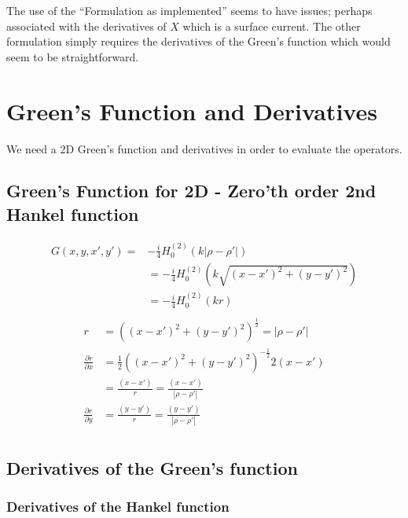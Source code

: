 \documentclass{article}
\newcommand{\0}{\varnothing}
\begin{document}
The use of the ``Formulation as implemented'' seems to have issues; perhaps associated with the derivatives of $X$ which is a surface current. The other formulation simply requires the derivatives of the Green's function which would seem to be straightforward.

\newpage
\section{Green's Function and Derivatives}

We need a 2D Green's function and derivatives in order to evaluate the operators.

\subsection{Green's Function for 2D - Zero'th order 2nd Hankel function}
\begin{align*}
    G(x, y, x', y') = &-\frac{i}{4}H_0^{(2)}(k|\rho-\rho'|)\\
     &= -\frac{i}{4}H_0^{(2)}(k\sqrt{(x-x')^2+(y-y')^2})\\
     &= -\frac{i}{4}H_0^{(2)}(k r)\\
\end{align*}
\begin{align*}
     r &= ((x-x')^2+(y-y')^2)^{\frac{1}{2}} = |\rho-\rho'|\\
     \frac{\partial r}{\partial x} &= \frac{1}{2} ((x-x')^2+(y-y')^2)^{-\frac{1}{2}} 2 (x-x')\\ 
     & = \frac{(x-x')}{r} = \frac{(x-x')}{|\rho-\rho'|}\\
     \frac{\partial r}{\partial y}&=  \frac{(y-y')}{r} = \frac{(y-y')}{|\rho-\rho'|}\\
\end{align*}

\subsection{Derivatives of the Green's function}

\subsubsection{Derivatives of the Hankel function}
\end{document}
